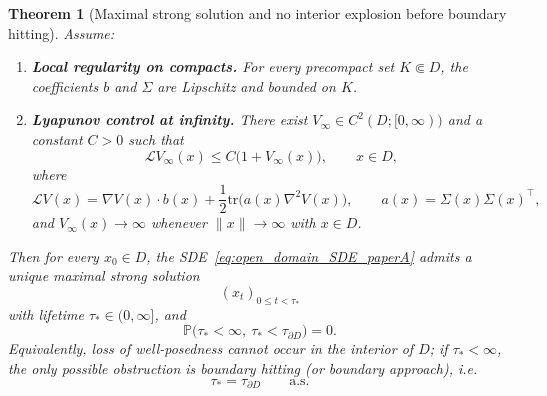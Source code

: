 \documentclass[pdflatex,sn-mathphys-ay]{sn-jnl}
\theoremstyle{thmstyleone}
\newtheorem{theorem}{Theorem}[section]
\theoremstyle{definition}
\theoremstyle{remark}
\begin{document}
\begin{theorem}[Maximal strong solution and no interior explosion before boundary hitting]
\label{thm:maximal_no_interior_explosion_paperA}
Assume:
\begin{enumerate}[label=(A\arabic*)]
\item \textbf{Local regularity on compacts.} For every precompact set \(K\Subset D\), the coefficients \(b\) and \(\Sigma\) are Lipschitz and bounded on \(K\).
\item \textbf{Lyapunov control at infinity.} There exist \(V_\infty\in C^2(D;[0,\infty))\) and a constant \(C>0\) such that
\begin{equation}
\label{eq:Lyap_infty_cond_paperA}
\mathcal L V_\infty(x)\le C\bigl(1+V_\infty(x)\bigr),\qquad x\in D,
\end{equation}
where
\[
\mathcal L V(x)=\nabla V(x)\cdot b(x)+\frac12\mathrm{tr}\!\bigl(a(x)\nabla^2V(x)\bigr),
\qquad a(x)=\Sigma(x)\Sigma(x)^\top,
\]
and \(V_\infty(x)\to\infty\) whenever \(\|x\|\to\infty\) with \(x\in D\).
\end{enumerate}
Then for every \(x_0\in D\), the SDE~\eqref{eq:open_domain_SDE_paperA} admits a unique maximal strong solution
\[
(x_t)_{0\le t<\tau_*}
\]
with lifetime \(\tau_*\in(0,\infty]\), and
\begin{equation}
\label{eq:no_interior_blowup_paperA}
\mathbb P\bigl(\tau_*<\infty,\ \tau_*<\tau_{\partial D}\bigr)=0.
\end{equation}
Equivalently, loss of well-posedness cannot occur in the interior of \(D\); if \(\tau_*<\infty\), the only possible obstruction is boundary hitting (or boundary approach), i.e.
\begin{equation}
\label{eq:tau_star_equals_boundary_paperA}
\tau_*=\tau_{\partial D}\qquad\text{a.s.}
\end{equation}
\end{theorem}
\end{document}
